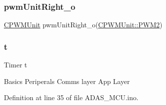 \subsubsection{\texorpdfstring{pwm\+Unit\+Right\+\_\+o}{pwmUnitRight\_o}}
{\footnotesize\ttfamily \mbox{\hyperlink{class_c_p_w_m_unit}{C\+P\+W\+M\+Unit}} pwm\+Unit\+Right\+\_\+o(\mbox{\hyperlink{class_c_p_w_m_unit_ad3e55d1df0367d8a090d4b835704be44afc7888ea63be5da5551d10db3d676185}{C\+P\+W\+M\+Unit\+::\+P\+W\+M2}})}

\mbox{\label{_a_d_a_s___m_c_u_8ino_a978d88b393c8a37dc2614c88788b3442}} 
\subsubsection{\texorpdfstring{t}{t}}
{\footnotesize\ttfamily Timer t}

Basics Periperals Comms layer App Layer 

Definition at line 35 of file A\+D\+A\+S\+\_\+\+M\+C\+U.\+ino.

